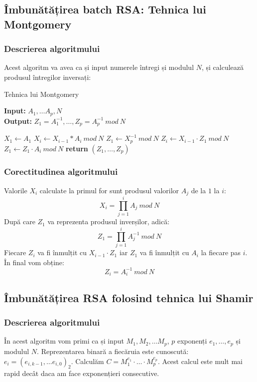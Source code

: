 \documentclass[12]{report}
\begin{document}
		  \subsection{Îmbunătățirea batch RSA: Tehnica lui Montgomery}
		
		
		
		
		
		
		  \subsubsection{Descrierea algoritmului}
		  Acest algoritm va avea ca și input numerele întregi și modulul $N$, și calculează produsul întregilor inversați:  
		  \begin{algorithm}[H]
		   \caption{Tehnica lui Montgomery}
		   \textbf{Input:} $A_1, \dots A_p,N$ \\
		   \textbf{Output:} $Z_1=A_{1}^{-1}, \dots ,Z_p=A_{p}^{-1} \ mod \ N$
		   \begin{algorithmic}
		   	\State $X_1 \gets A_1$
		   	\State $X_i \gets X_{i-1}*A_i \ mod \ N$
		   	\EndFor
		   	\State $Z_1 \gets X_{p}^{-1} \ mod \ N$
		   		\State $Z_i \gets X_{i-1} \cdot   Z_1 \ mod \ N$
		   		\State $Z_1 \gets Z_1 \cdot   A_i \ mod \ N$
		   		\State
		   	\EndFor
		   	\State \textbf{return} $(Z_1, \dots ,Z_p)$ 
		   \end{algorithmic}
		   \end{algorithm}
		   
		   \subsubsection{Corectitudinea algoritmului}
		   Valorile $X_i$ calculate la primul for sunt produsul valorilor $A_j$ de la $1$ la $i$:
		   $$ X_i=\prod_{j=1}^{i} A_j \ mod \ N$$
		   După care $Z_1$ va reprezenta produsul inverșilor, adică:
		   $$Z_1=\prod_{j=1}^{i} A_{j}^{-1} \ mod \ N$$
		   Fiecare $Z_i$ va fi înmulțit cu $X_{i-1} \cdot   Z_1$ iar $Z_1$ va fi înmulțit cu $A_i$ la fiecare pas $i$. În final vom obține:
		   $$Z_i=A_{i}^{-1} \ mod \ N$$ 
		   \subsection{Îmbunătățirea RSA folosind tehnica lui Shamir}
		   \subsubsection{Descrierea algoritmului}
		   În acest algoritm vom primi ca și input $M_1,M_2, \dots M_p$, $p$ exponenți $e_1, \dots ,e_p$ și modulul $N$. Reprezentarea binară a fiecăruia este cunoscută: $e_i=(e_{i,k-1}, \dots e_{i,0})_2$. Calculăm $C=M_{1}^{e_1} \cdot \dots  \cdot M_{p}^{e_p}$. Acest calcul este mult mai rapid decât daca am face exponențieri consecutive.
\end{document}
